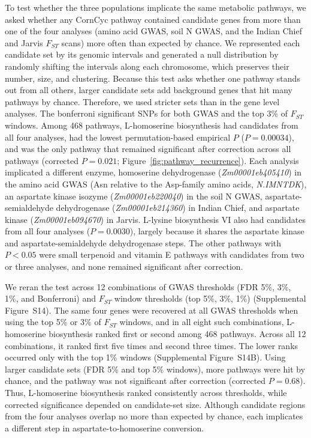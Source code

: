 \documentclass[namedate,unnumsec,webpdf,contemporary,large]{oup-authoring-template}
\begin{document}
To test whether the three populations implicate the same metabolic pathways, we asked whether any CornCyc pathway \citep{Hawkins2021PMN} contained candidate genes from more than one of the four analyses (amino acid GWAS, soil N GWAS, and the Indian Chief and Jarvis $F_{ST}$ scans) more often than expected by chance. We represented each candidate set by its genomic intervals and generated a null distribution by randomly shifting the intervals along each chromosome, which preserves their number, size, and clustering. Because this test asks whether one pathway stands out from all others, larger candidate sets add background genes that hit many pathways by chance. Therefore, we used stricter sets than in the gene level analyses. The bonferroni significant SNPs for both GWAS and the top 3\% of $F_{ST}$ windows. Among 468 pathways, L-homoserine biosynthesis had candidates from all four analyses, had the lowest permutation-based empirical $P$ ($P = 0.00034$), and was the only pathway that remained significant after correction across all pathways (corrected $P = 0.021$; Figure~\ref{fig:pathway_recurrence}). Each analysis implicated a different enzyme, homoserine dehydrogenase (\textit{Zm00001eb405410}) in the amino acid GWAS (Asn relative to the Asp-family amino acids, \textit{N.IMNTDK}), an aspartate kinase isozyme (\textit{Zm00001eb220040}) in the soil N GWAS, aspartate-semialdehyde dehydrogenase (\textit{Zm00001eb214360}) in Indian Chief, and aspartate kinase (\textit{Zm00001eb094670}) in Jarvis. L-lysine biosynthesis VI also had candidates from all four analyses ($P = 0.0030$), largely because it shares the aspartate kinase and aspartate-semialdehyde dehydrogenase steps. The other pathways with $P < 0.05$ were small terpenoid and vitamin E pathways with candidates from two or three analyses, and none remained significant after correction.

We reran the test across 12 combinations of GWAS thresholds (FDR 5\%, 3\%, 1\%, and Bonferroni) and $F_{ST}$ window thresholds (top 5\%, 3\%, 1\%) (Supplemental Figure~S14). The same four genes were recovered at all GWAS thresholds when using the top 5\% or 3\% of $F_{ST}$ windows, and in all eight such combinations, L-homoserine biosynthesis ranked first or second among 468 pathways. Across all 12 combinations, it ranked first five times and second three times. The lower ranks occurred only with the top 1\% windows (Supplemental Figure~S14B). Using larger candidate sets (FDR 5\% and top 5\% windows), more pathways were hit by chance, and the pathway was not significant after correction (corrected $P=0.68$). Thus, L-homoserine biosynthesis ranked consistently across thresholds, while corrected significance depended on candidate-set size. Although candidate regions from the four analyses overlap no more than expected by chance, each implicates a different step in aspartate-to-homoserine conversion.
\end{document}

